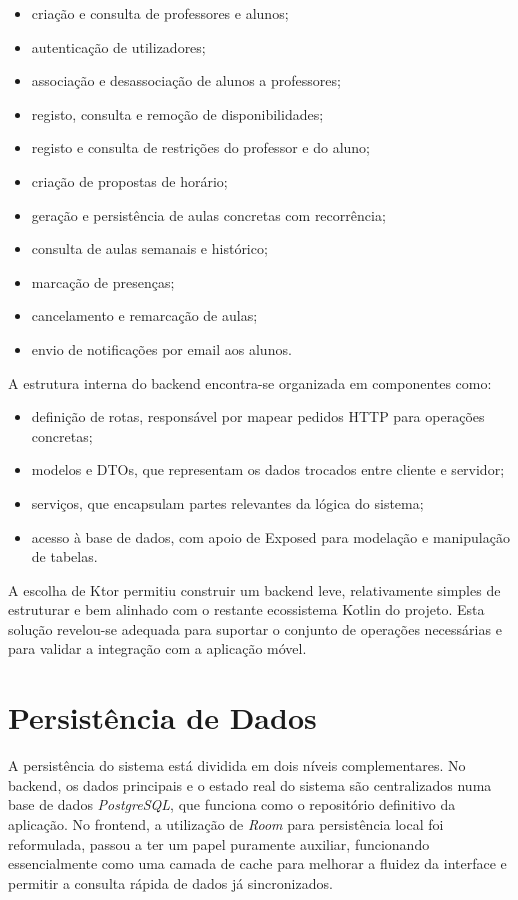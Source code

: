 \begin{itemize}
    \item criação e consulta de professores e alunos;
    \item autenticação de utilizadores;
    \item associação e desassociação de alunos a professores;
    \item registo, consulta e remoção de disponibilidades;
    \item registo e consulta de restrições do professor e do aluno;
    \item criação de propostas de horário;
    \item geração e persistência de aulas concretas com recorrência;
    \item consulta de aulas semanais e histórico;
    \item marcação de presenças;
    \item cancelamento e remarcação de aulas;
    \item envio de notificações por email aos alunos.
\end{itemize}

A estrutura interna do backend encontra-se organizada em componentes como:

\begin{itemize}
    \item definição de rotas, responsável por mapear pedidos HTTP para operações concretas;
    \item modelos e DTOs, que representam os dados trocados entre cliente e servidor;
    \item serviços, que encapsulam partes relevantes da lógica do sistema;
    \item acesso à base de dados, com apoio de Exposed para modelação e manipulação de tabelas.
\end{itemize}

A escolha de Ktor permitiu construir um backend leve, relativamente simples de estruturar e bem alinhado com o restante ecossistema Kotlin do projeto.
Esta solução revelou-se adequada para suportar o conjunto de operações necessárias e para validar a integração com a aplicação móvel.

\section{Persistência de Dados}

A persistência do sistema está dividida em dois níveis complementares. No backend, os dados principais e o estado real do sistema são centralizados numa base de dados \textit{PostgreSQL}, que funciona como o repositório definitivo da aplicação. No frontend, a utilização de \textit{Room} para persistência local foi reformulada, passou a ter um papel puramente auxiliar, funcionando essencialmente como uma camada de cache para melhorar a fluidez da interface e permitir a consulta rápida de dados já sincronizados.

